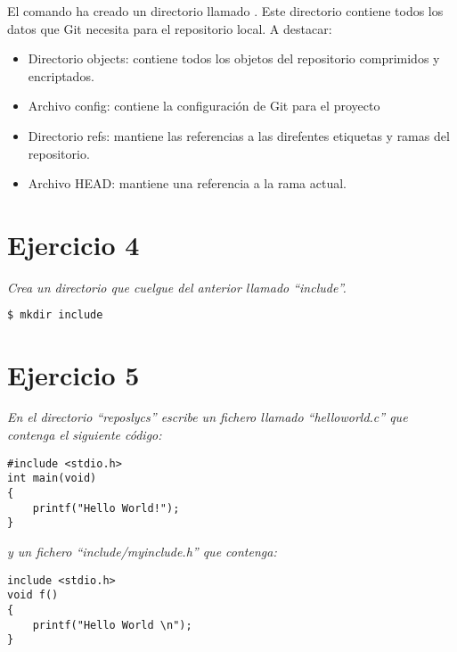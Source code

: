El comando ha creado un directorio llamado . Este directorio contiene todos los datos que Git necesita para el repositorio local. A destacar:
\begin{itemize}
    \item Directorio objects: contiene todos los objetos del repositorio comprimidos y encriptados.
    \item Archivo config: contiene la configuración de Git para el proyecto
    \item Directorio refs: mantiene las referencias a las direfentes etiquetas y ramas del repositorio.
    \item Archivo HEAD: mantiene una referencia a la rama actual.
\end{itemize}

\section{Ejercicio 4}
\begin{center}
    \parbox{12cm}{\justify\textit{Crea un directorio que cuelgue del anterior llamado ``include''.
    }}
\end{center}
\begin{lstlisting}[xleftmargin=.16\textwidth,language=bash]
$ mkdir include
\end{lstlisting}

\section{Ejercicio 5}
\begin{center}
    \parbox{12cm}{\justify\textit{
        En el directorio ``reposlycs'' escribe un fichero llamado “helloworld.c” que contenga el siguiente código:
    }}
\end{center}

\begin{lstlisting}[style=CStyle,xleftmargin=.3\textwidth]
#include <stdio.h>
int main(void)
{
    printf("Hello World!"); 
}\end{lstlisting}
    
\begin{center}
    \parbox{12cm}{\justify\textit{
        y un fichero ``include/myinclude.h'' que contenga:
    }}
\end{center}

\begin{lstlisting}[style=CStyle,xleftmargin=.3\textwidth]
include <stdio.h>
void f()
{
    printf("Hello World \n");
}\end{lstlisting}

